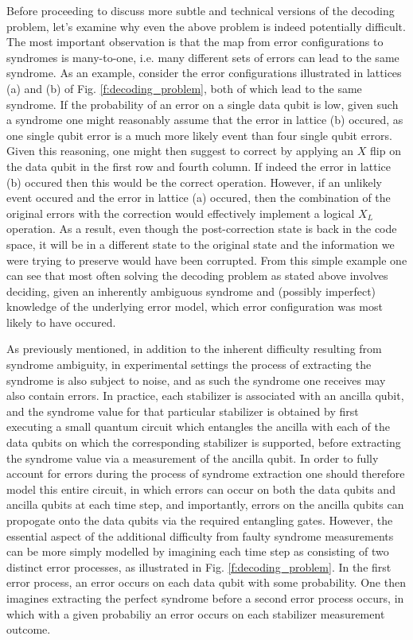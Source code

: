 \documentclass[onecolumn,preprintnumbers,amsmath,amssymb,notitlepage,nofootinbib,longbibliography,superscriptaddress,aps,pra,10pt]{revtex4-1}
\begin{document}
    \noindent Before proceeding to discuss more subtle and technical versions of the decoding problem, let's examine why even the above problem is indeed potentially difficult. The most important observation is that the map from error configurations to syndromes is many-to-one, i.e. many different sets of errors can lead to the same syndrome. As an example, consider the error configurations illustrated in lattices (a) and (b) of Fig. \ref{f:decoding_problem}, both of which lead to the same syndrome. If the probability of an error on a single data qubit is low, given such a syndrome one might reasonably assume that the error in lattice (b) occured, as one single qubit error is a much more likely event than four single qubit errors. Given this reasoning, one might then suggest to correct by applying an $X$ flip on the data qubit in the first row and fourth column. If indeed the error in lattice (b) occured then this would be the correct operation. However, if an unlikely event occured and the error in lattice (a) occured, then the combination of the original errors with the correction would effectively implement a logical $X_L$ operation. As a result, even though the post-correction state is back in the code space, it will be in a different state to the original state and the information we were trying to preserve would have been corrupted. From this simple example one can see that most often solving the decoding problem as stated above involves deciding, given an inherently ambiguous syndrome and (possibly imperfect) knowledge of the underlying error model, which error configuration was most likely to have occured. 

    As previously mentioned, in addition to the inherent difficulty resulting from syndrome ambiguity, in experimental settings the process of extracting the syndrome is also subject to noise, and as such the syndrome one receives may also contain errors. In practice, each stabilizer is associated with an ancilla qubit, and the syndrome value for that particular stabilizer is obtained by first executing a small quantum circuit which entangles the ancilla with each of the data qubits on which the corresponding stabilizer is supported, before extracting the syndrome value via a measurement of the ancilla qubit. In order to fully account for errors during the process of syndrome extraction one should therefore model this entire circuit, in which errors can occur on both the data qubits and ancilla qubits at each time step, and importantly, errors on the ancilla qubits can propogate onto the data qubits via the required entangling gates. However, the essential aspect of the additional difficulty from faulty syndrome measurements can be more simply modelled by imagining each time step as consisting of two distinct error processes, as illustrated in Fig. \ref{f:decoding_problem}. In the first error process, an error occurs on each data qubit with some probability. One then imagines extracting the perfect syndrome before a second error process occurs, in which with a given probabiliy an error occurs on each stabilizer measurement outcome.
\end{document}
